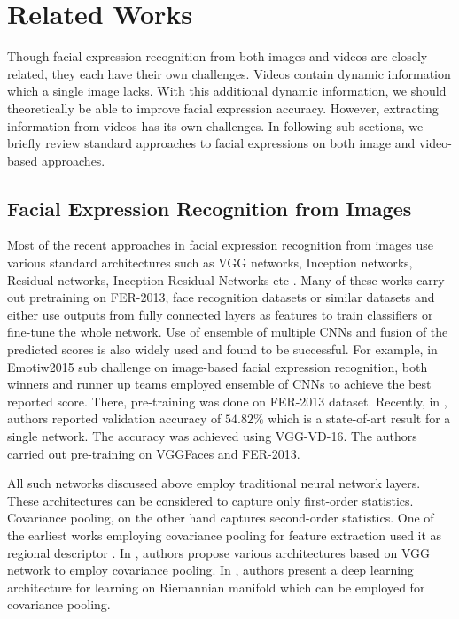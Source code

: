 \documentclass[10pt,twocolumn,letterpaper]{article}
\begin{document}
		
	\section{Related Works}
	Though facial expression recognition from both images and videos are closely related, they each have their own challenges. Videos contain dynamic information which a single image lacks. With this additional dynamic information, we should theoretically be able to improve facial expression accuracy. However, extracting information from videos has its own challenges. In following sub-sections, we briefly review standard approaches to facial expressions on both image and video-based approaches.
		
	\subsection{Facial Expression Recognition from Images}
	
	Most of the recent approaches in facial expression recognition from images use various standard architectures such as VGG networks, Inception networks, Residual networks, Inception-Residual Networks etc \cite{grimaces}\cite{face2exp}\cite{regularizefacenet}. Many of these works carry out pretraining on FER-2013, face recognition datasets or similar datasets and either use outputs from fully connected layers as features to train classifiers or fine-tune the whole network. Use of ensemble of multiple CNNs and fusion of the predicted scores is also widely used and found to be successful. For example, in Emotiw2015 sub challenge on image-based facial expression recognition, both winners and runner up teams \cite{committee}\cite{cmu} employed ensemble of CNNs to achieve the best reported score. There, pre-training was done on FER-2013 dataset. Recently, in \cite{grimaces}, authors reported validation accuracy of $54.82\%$ which is a state-of-art result for a single network. The accuracy was achieved using VGG-VD-16. The authors carried out pre-training on VGGFaces and FER-2013.
				
	All such networks discussed above employ traditional neural network layers. These architectures can be considered to capture only first-order statistics. Covariance pooling, on the other hand captures second-order statistics. One of the earliest works employing covariance pooling for feature extraction used it as regional descriptor \cite{semanticsegmentation}\cite{cdu}. In \cite{epfl}, authors propose various architectures based on VGG network to employ covariance pooling. In \cite{spdnet}, authors present a deep learning architecture for learning on Riemannian manifold which can be employed for covariance pooling.
		
\end{document}
